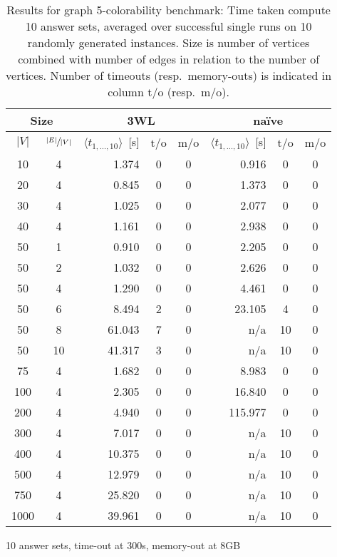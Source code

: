 \documentclass{vutinfth} %
\begin{document}
\begin{table}
\begin{center}
	\begin{tabular}{|cc||rcc|rcc|}
\hline
\multicolumn{2}{|c||}{Size} & \multicolumn{3}{c|}{3WL} & \multicolumn{3}{c|}{na\"{i}ve} \\
\hline
$|V|$ & $\sfrac{|E|}{|V|}$& $\langle t_{1, \ldots, 10} \rangle$~[s]&t/o&m/o& $\langle t_{1, \ldots, 10} \rangle$~[s]&t/o&m/o\\
\hline
\hline
  10 &   4 & 	  1.374 & 0 & 0 &	  0.916 &  0 & 0 \\
  20 &   4 & 	  0.845 & 0 & 0 &	  1.373 &  0 & 0 \\
  30 &   4 & 	  1.025 & 0 & 0 &	  2.077 &  0 & 0 \\
  40 &   4 & 	  1.161 & 0 & 0 &	  2.938 &  0 & 0 \\
  50 &   1 & 	  0.910 & 0 & 0 &	  2.205 &  0 & 0 \\
  50 &   2 & 	  1.032 & 0 & 0 &	  2.626 &  0 & 0 \\
  50 &   4 & 	  1.290 & 0 & 0 &	  4.461 &  0 & 0 \\
  50 &   6 & 	  8.494 & 2 & 0 &	 23.105 &  4 & 0 \\
  50 &   8 & 	 61.043 & 7 & 0 &	    n/a & 10 & 0 \\
  50 &  10 & 	 41.317 & 3 & 0 &	    n/a & 10 & 0 \\
  75 &   4 & 	  1.682 & 0 & 0 &	  8.983 &  0 & 0 \\
 100 &   4 & 	  2.305 & 0 & 0 &	 16.840 &  0 & 0 \\
 200 &   4 & 	  4.940 & 0 & 0 &	115.977 &  0 & 0 \\
 300 &   4 & 	  7.017 & 0 & 0 &	    n/a & 10 & 0 \\
 400 &   4 & 	 10.375 & 0 & 0 &	    n/a & 10 & 0 \\
 500 &   4 & 	 12.979 & 0 & 0 &	    n/a & 10 & 0 \\
 750 &   4 & 	 25.820 & 0 & 0 &	    n/a & 10 & 0 \\
1000 &   4 & 	 39.961 & 0 & 0 &	    n/a & 10 & 0 \\
\hline
	\end{tabular}
	
\hspace{3mm}

10 answer sets, time-out at 300s, memory-out at 8GB
	\end{center}
	\caption[Results for graph 5-colorability benchmark]{Results for graph 5-colorability benchmark: Time taken compute 10 answer sets, averaged over successful single runs on 10 randomly generated instances. Size is number of vertices combined with number of edges in relation to the number of vertices. Number of timeouts (resp.~memory-outs) is indicated in column t/o (resp.~m/o).}
	\label{tbl:5col}
\end{table}
\end{document}
